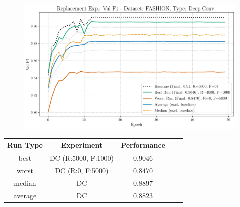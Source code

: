 \begin{figure}[htbp]
	\centering
	\includegraphics[width=.85\textwidth]{abb/strat_classifier_performance/FASHION_STRATIFIED_CLASSIFIERS_VANILLA_GAN/replacement_experiments/val_f1_score_['VANILLA']_FASHION_all.png}
	\label{fig:app_strat_class_performance_replacement_exp._val_f1_score_}
\end{figure}
\begin{table}[H]
	\centering
	\vspace{-1em}
	\begin{tabular}{|c|c|c|c|c|}
		\hline
		Run Type & Experiment & Performance \\ \hline
		best & DC (R:5000, F:1000) & $0.9046$\\ \hline
		worst & DC (R:0, F:5000) & $0.8470$\\ \hline
		median & DC & $0.8897$\\ \hline
		average & DC & $0.8823$
		\\ \hline
	\end{tabular}
\end{table}
\newpage
